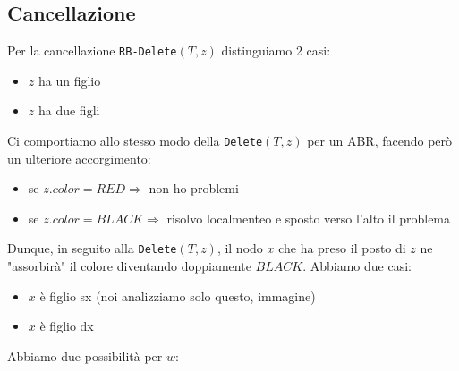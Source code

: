 \subsection{Cancellazione}
Per la cancellazione \verb|RB-Delete|$(T,z)$ distinguiamo 2 casi:
\begin{itemize}
    \item $z$ ha un figlio
    \item $z$ ha due figli
\end{itemize}
Ci comportiamo allo stesso modo della \verb|Delete|$(T,z)$ per un ABR, facendo però un ulteriore accorgimento:
\begin{itemize}
    \item se $z.color = RED \Rightarrow$ non ho problemi
    \item se $z.color = BLACK \Rightarrow$ risolvo localmenteo e sposto verso l'alto il problema
\end{itemize}
Dunque, in seguito alla \verb|Delete|$(T,z)$, il nodo $x$ che ha preso il posto di $z$ ne "assorbirà" il colore diventando doppiamente $BLACK$. Abbiamo due casi:
\begin{itemize}
    \item $x$ è figlio sx (noi analizziamo solo questo, immagine)
    \item $x$ è figlio dx
\end{itemize}
Abbiamo due possibilità per $w$:
